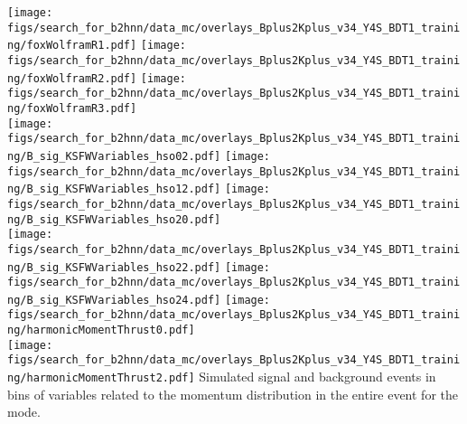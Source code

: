 {
\texttt{[image: figs/search\_for\_b2hnn/data\_mc/overlays\_Bplus2Kplus\_v34\_Y4S\_BDT1\_training/foxWolframR1.pdf]}
\texttt{[image: figs/search\_for\_b2hnn/data\_mc/overlays\_Bplus2Kplus\_v34\_Y4S\_BDT1\_training/foxWolframR2.pdf]}
\texttt{[image: figs/search\_for\_b2hnn/data\_mc/overlays\_Bplus2Kplus\_v34\_Y4S\_BDT1\_training/foxWolframR3.pdf]}\\
\texttt{[image: figs/search\_for\_b2hnn/data\_mc/overlays\_Bplus2Kplus\_v34\_Y4S\_BDT1\_training/B\_sig\_KSFWVariables\_hso02.pdf]}
\texttt{[image: figs/search\_for\_b2hnn/data\_mc/overlays\_Bplus2Kplus\_v34\_Y4S\_BDT1\_training/B\_sig\_KSFWVariables\_hso12.pdf]}
\texttt{[image: figs/search\_for\_b2hnn/data\_mc/overlays\_Bplus2Kplus\_v34\_Y4S\_BDT1\_training/B\_sig\_KSFWVariables\_hso20.pdf]}\\
\texttt{[image: figs/search\_for\_b2hnn/data\_mc/overlays\_Bplus2Kplus\_v34\_Y4S\_BDT1\_training/B\_sig\_KSFWVariables\_hso22.pdf]}
\texttt{[image: figs/search\_for\_b2hnn/data\_mc/overlays\_Bplus2Kplus\_v34\_Y4S\_BDT1\_training/B\_sig\_KSFWVariables\_hso24.pdf]}
\texttt{[image: figs/search\_for\_b2hnn/data\_mc/overlays\_Bplus2Kplus\_v34\_Y4S\_BDT1\_training/harmonicMomentThrust0.pdf]}\\
\texttt{[image: figs/search\_for\_b2hnn/data\_mc/overlays\_Bplus2Kplus\_v34\_Y4S\_BDT1\_training/harmonicMomentThrust2.pdf]}
}
{
Simulated signal and background events in bins of variables related to the momentum distribution in the entire event for the \BKpnn mode.
\overlaytext
}

